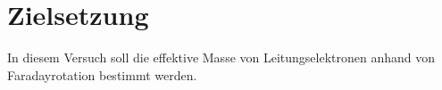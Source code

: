 \chapter{Zielsetzung}
\label{cha:zielsetzung}
In diesem Versuch soll die effektive Masse von Leitungselektronen anhand von Faradayrotation bestimmt werden.